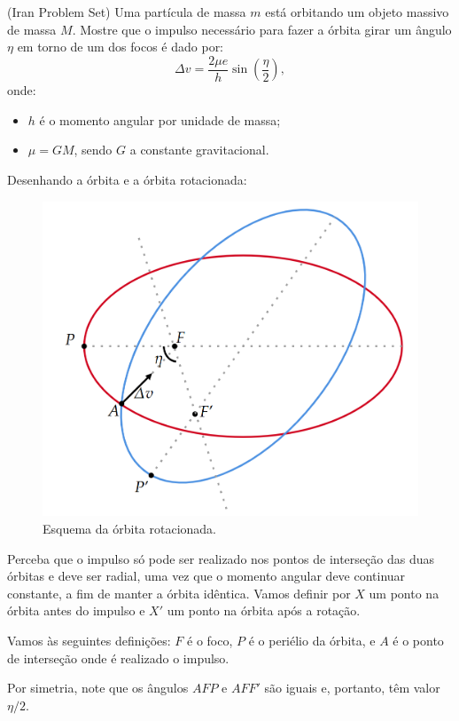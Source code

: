 \documentclass[11pt]{article}
\begin{document}
\begin{pproblem} (Iran Problem Set) 
    Uma partícula de massa \(m\) está orbitando um objeto massivo de massa \(M\). Mostre que o impulso necessário para fazer a órbita girar um ângulo \(\eta\) em torno de um dos focos é dado por:
    \[
    \Delta v = \frac{2\mu e}{h}\sin\left(\frac{\eta}{2}\right),
    \]
    onde:
    \begin{itemize}
        \item \(h\) é o momento angular por unidade de massa;
        \item \(\mu = GM\), sendo \(G\) a constante gravitacional.
    \end{itemize}
    \begin{pssolution*}{}{}
        Desenhando a órbita e a órbita rotacionada:

        \begin{figure}[H]
            \centering
            \includegraphics[width=0.7\linewidth]{imagens/esquemarotorb.png}
            \caption{Esquema da órbita rotacionada.}
        \end{figure}

        Perceba que o impulso só pode ser realizado nos pontos de interseção das duas órbitas e deve ser radial, uma vez que o momento angular deve continuar constante, a fim de manter a órbita idêntica. Vamos definir por \(X\) um ponto na órbita antes do impulso e \(X'\) um ponto na órbita após a rotação.

        Vamos às seguintes definições: \(F\) é o foco, \(P\) é o periélio da órbita, e \(A\) é o ponto de interseção onde é realizado o impulso.

        Por simetria, note que os ângulos \(AFP\) e \(AFF'\) são iguais e, portanto, têm valor \(\eta/2\).


\end{pssolution*}
\end{pproblem}
\end{document}
